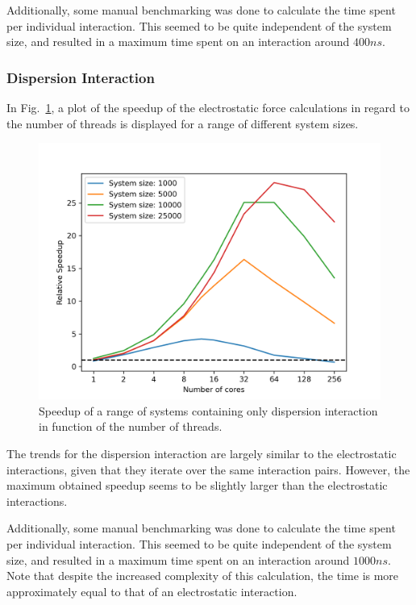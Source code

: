 \documentclass[conference]{IEEEtran}
\begin{document}
        Additionally, some manual benchmarking was done to calculate the time spent per individual interaction. This
        seemed to be quite independent of the system size, and resulted in a maximum time spent on an interaction 
        around $400 ns$.

        \subsubsection{Dispersion Interaction}

        In Fig.~\ref{fig:dispersion-speedup}, a plot of the speedup of the electrostatic force calculations 
        in regard to the number of threads is displayed for a range of different system sizes.
        \begin{figure}[H]
            \centering
            \includegraphics[width=\linewidth]{./images/dispersion_scaling.png} %
            \caption{Speedup of a range of systems containing only dispersion interaction in function of the number 
            of threads.}\label{fig:dispersion-speedup}
        \end{figure}

        The trends for the dispersion interaction are largely similar to the electrostatic interactions, given that
        they iterate over the same interaction pairs. However, the maximum obtained speedup seems to be slightly
        larger than the electrostatic interactions.

        Additionally, some manual benchmarking was done to calculate the time spent per individual interaction. This
        seemed to be quite independent of the system size, and resulted in a maximum time spent on an interaction 
        around $1000 ns$. Note that despite the increased complexity of this calculation, the time is more approximately
        equal to that of an electrostatic interaction.
\end{document}
